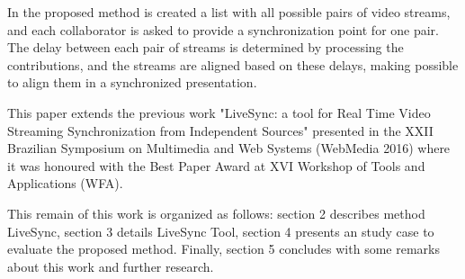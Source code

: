 In the proposed method is created a list with all possible pairs of video streams, and each collaborator is asked to provide a synchronization point for one pair.  The delay between each pair of streams is determined by processing the contributions, and the streams are aligned based on these delays, making possible to align them in a synchronized presentation.

This paper extends the previous work "LiveSync: a tool for Real Time Video Streaming Synchronization from Independent Sources" \cite{delivesync} presented in the XXII Brazilian Symposium on Multimedia and Web Systems (WebMedia 2016) where it was honoured with the Best Paper Award at XVI Workshop of Tools and Applications (WFA).

This remain of this work is organized as follows: section 2 describes method LiveSync, section 3 details LiveSync Tool, section 4 presents an study case to evaluate the proposed method. Finally, section 5 concludes with some remarks about this work and further research.   


